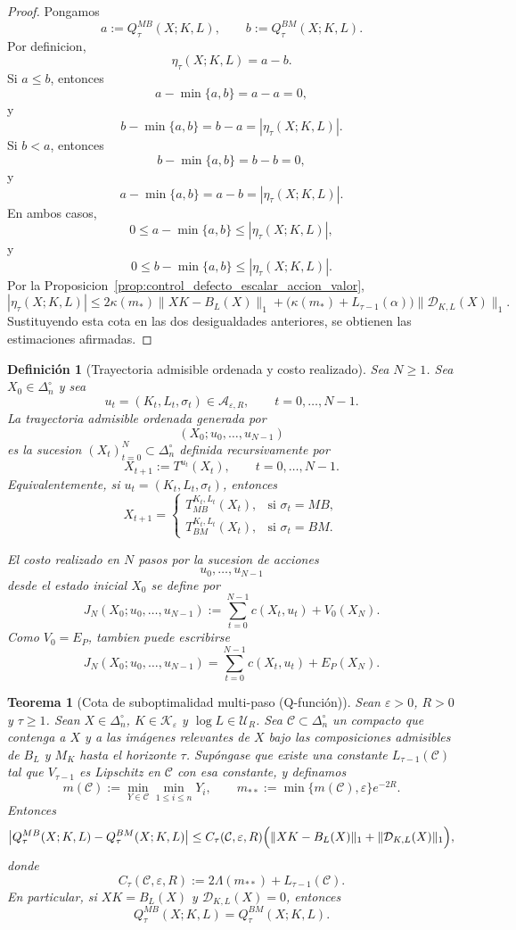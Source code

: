 \documentclass[12pt]{article}
\newtheorem{definicion}{Definición}[section]
\newtheorem{teorema}{Teorema}[section]
\begin{document}
\begin{proof}
Pongamos
\[
a:=Q_\tau^{MB}(X;K,L),
\qquad
b:=Q_\tau^{BM}(X;K,L).
\]
Por definicion,
\[
\eta_\tau(X;K,L)=a-b.
\]
Si \(a\le b\), entonces
\[
a-\min\{a,b\}=a-a=0,
\]
y
\[
b-\min\{a,b\}=b-a=|\eta_\tau(X;K,L)|.
\]
Si \(b<a\), entonces
\[
b-\min\{a,b\}=b-b=0,
\]
y
\[
a-\min\{a,b\}=a-b=|\eta_\tau(X;K,L)|.
\]
En ambos casos,
\[
0
\le
a-\min\{a,b\}
\le
|\eta_\tau(X;K,L)|,
\]
y
\[
0
\le
b-\min\{a,b\}
\le
|\eta_\tau(X;K,L)|.
\]
Por la Proposicion~\ref{prop:control_defecto_escalar_accion_valor},
\[
|\eta_\tau(X;K,L)|
\le
2\kappa(m_*)\|XK-B_L(X)\|_1
+
\bigl(\kappa(m_*)+L_{\tau-1}(\alpha)\bigr)
\|\mathcal D_{K,L}(X)\|_1.
\]
Sustituyendo esta cota en las dos desigualdades anteriores, se obtienen las estimaciones afirmadas.
\end{proof}

\begin{definicion}[Trayectoria admisible ordenada y costo realizado]\label{def:trayectoria_admisible_ordenada_costo_realizado}
Sea \(N\ge 1\). Sea \(X_0\in\Delta_n^\circ\) y sea
\[
u_t=(K_t,L_t,\sigma_t)\in\mathcal A_{\varepsilon,R},
\qquad
t=0,\dots,N-1.
\]
La trayectoria admisible ordenada generada por
\[
(X_0;u_0,\dots,u_{N-1})
\]
es la sucesion \((X_t)_{t=0}^N\subset\Delta_n^\circ\) definida recursivamente por
\[
X_{t+1}
:=
T^{u_t}(X_t),
\qquad
t=0,\dots,N-1.
\]
Equivalentemente, si \(u_t=(K_t,L_t,\sigma_t)\), entonces
\[
X_{t+1}
=
\begin{cases}
T_{MB}^{K_t,L_t}(X_t), & \text{si } \sigma_t=MB,\\[2mm]
T_{BM}^{K_t,L_t}(X_t), & \text{si } \sigma_t=BM.
\end{cases}
\]

El costo realizado en \(N\) pasos por la sucesion de acciones
\[
u_0,\dots,u_{N-1}
\]
desde el estado inicial \(X_0\) se define por
\[
J_N(X_0;u_0,\dots,u_{N-1})
:=
\sum_{t=0}^{N-1}c(X_t,u_t)
+
V_0(X_N).
\]
Como \(V_0=E_P\), tambien puede escribirse
\[
J_N(X_0;u_0,\dots,u_{N-1})
=
\sum_{t=0}^{N-1}c(X_t,u_t)
+
E_P(X_N).
\]
\end{definicion}

\begin{teorema}[Cota de suboptimalidad multi-paso (Q-función)]\label{teo:subopt_multi_paso}
Sean \(\varepsilon>0\), \(R>0\) y \(\tau\ge 1\). Sean \(X\in\Delta_n^\circ\), \(K\in\mathcal K_\varepsilon\) y \(\log L\in\mathcal U_R\). Sea \(\mathcal C\subset\Delta_n^\circ\) un compacto que contenga a \(X\) y a las imágenes relevantes de \(X\) bajo las composiciones admisibles de \(B_L\) y \(M_K\) hasta el horizonte \(\tau\). Supóngase que existe una constante \(L_{\tau-1}(\mathcal C)\) tal que \(V_{\tau-1}\) es Lipschitz en \(\mathcal C\) con esa constante, y definamos
\[
m(\mathcal C):=\min_{Y\in\mathcal C}\min_{1\le i\le n}Y_i,
\qquad
m_{**}:=\min\{m(\mathcal C),\varepsilon\}e^{-2R}.
\]
Entonces
\[
\bigl|Q_\tau^{MB}(X;K,L)-Q_\tau^{BM}(X;K,L)\bigr|
\le
C_\tau(\mathcal C,\varepsilon,R)\Bigl(\|XK-B_L(X)\|_1+\|\mathcal D_{K,L}(X)\|_1\Bigr),
\]
donde
\[
C_\tau(\mathcal C,\varepsilon,R):=2\Lambda(m_{**})+L_{\tau-1}(\mathcal C).
\]
En particular, si \(XK=B_L(X)\) y \(\mathcal D_{K,L}(X)=0\), entonces
\[
Q_\tau^{MB}(X;K,L)=Q_\tau^{BM}(X;K,L).
\]
\end{teorema}
\end{document}
